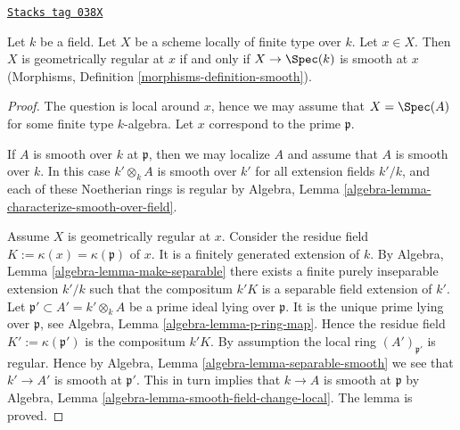 \begin{lemma}
\label{varieties-lemma-geometrically-regular-smooth}
\href{https://stacks.math.columbia.edu/tag/038X}{\texttt{Stacks tag 038X}}

Let $k$ be a field.
Let $X$ be a scheme locally of finite type over $k$.
Let $x \in X$.
Then $X$ is geometrically regular at $x$ if and only if $X \to \Spec(k)$
is smooth at $x$ (Morphisms, Definition \ref{morphisms-definition-smooth}).
\end{lemma}

\begin{proof}
The question is local around $x$,
hence we may assume that $X = \Spec(A)$
for some finite type $k$-algebra.
Let $x$ correspond to the prime $\mathfrak p$.

\medskip\noindent
If $A$ is smooth over $k$ at $\mathfrak p$, then we may localize $A$
and assume that $A$ is smooth over $k$. In this case $k' \otimes_k A$
is smooth over $k'$ for all extension fields $k'/k$, and each of
these Noetherian rings is regular by
Algebra, Lemma \ref{algebra-lemma-characterize-smooth-over-field}.

\medskip\noindent
Assume $X$ is geometrically regular at $x$.
Consider the residue field $K := \kappa(x) = \kappa(\mathfrak p)$ of $x$.
It is a finitely generated extension of $k$.
By Algebra, Lemma \ref{algebra-lemma-make-separable}
there exists a finite purely inseparable
extension $k'/k$ such that the compositum
$k'K$ is a separable field extension of $k'$.
Let $\mathfrak p' \subset A' = k' \otimes_k A$ be a prime ideal
lying over $\mathfrak p$. It is the unique prime lying over $\mathfrak p$, see
Algebra, Lemma \ref{algebra-lemma-p-ring-map}.
Hence the residue field $K' := \kappa(\mathfrak p')$
is the compositum $k'K$. By assumption the local ring
$(A')_{\mathfrak p'}$ is regular. Hence by
Algebra, Lemma \ref{algebra-lemma-separable-smooth}
we see that $k' \to A'$ is smooth at $\mathfrak p'$.
This in turn implies that $k \to A$ is smooth at $\mathfrak p$ by
Algebra, Lemma \ref{algebra-lemma-smooth-field-change-local}.
The lemma is proved.
\end{proof}


